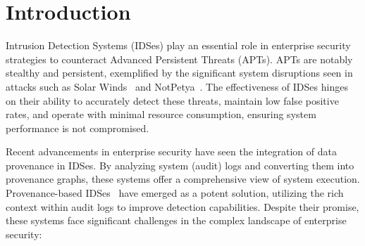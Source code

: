\section{Introduction}
\label{s:intro}

Intrusion Detection Systems (IDSes) play an essential role in enterprise security strategies to counteract Advanced Persistent Threats (APTs). APTs are notably stealthy and persistent, exemplified by the significant system disruptions seen in attacks such as Solar Winds~\cite{solarwinds} and NotPetya~\cite{notpetya}. The effectiveness of IDSes hinges on their ability to accurately detect these threats, maintain low false positive rates, and operate with minimal resource consumption, ensuring system performance is not compromised.


Recent advancements in enterprise security have seen the integration of data provenance in IDSes. By analyzing system (audit) logs and converting them into provenance graphs, these systems offer a comprehensive view of system execution. Provenance-based IDSes~\cite{streamspot,provdetector2020,wang2022threatrace,shadewatcher,yangprographer,han2020unicorn} have emerged as a potent solution, utilizing the rich context within audit logs to improve detection capabilities. Despite their promise, these systems face significant challenges in the complex landscape of enterprise security:

